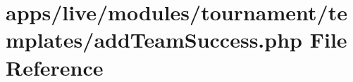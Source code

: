 \hypertarget{live_2modules_2tournament_2templates_2add_team_success_8php}{\section{apps/live/modules/tournament/templates/add\-Team\-Success.php File Reference}
\label{live_2modules_2tournament_2templates_2add_team_success_8php}
}
